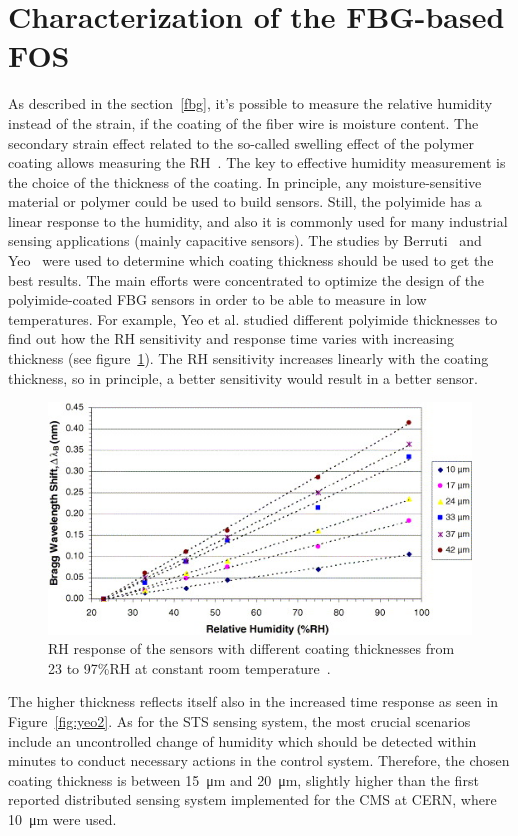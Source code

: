 \section{Characterization of the FBG-based FOS}
As described in the section~\ref{fbg}, it's possible to measure the relative humidity instead of the strain, if the coating of the fiber wire is moisture content. The secondary strain effect related to the so-called swelling effect of the polymer coating allows measuring the \gls{RH}~\cite{YEO_PI}. The key to effective humidity measurement is the choice of the thickness of the coating. In principle, any moisture-sensitive material or polymer could be used to build sensors. Still, the polyimide has a linear response to the humidity, and also it is commonly used for many industrial sensing applications (mainly capacitive sensors). The studies by Berruti~\cite{Berruti} and Yeo~\cite{YEO_PI} were used to determine which coating thickness should be used to get the best results. The main efforts were concentrated to optimize the design of the polyimide-coated FBG sensors in order to be able to measure in low temperatures. For example, Yeo et al. \cite{YEO_PI} studied different polyimide thicknesses to find out how the \gls{RH} sensitivity and response time varies with increasing thickness (see figure~\ref{fig:yeo}). The \gls{RH} sensitivity increases linearly with the coating thickness, so in principle, a better sensitivity would result in a better sensor.
\begin{figure}[!h]
\centering
\includegraphics[width=0.75\columnwidth]{Chapter5/images/yeo_coating.jpg}
\caption{RH response of the sensors with different coating thicknesses from 23 to 97\%RH at constant room temperature~\cite{YEO_PI}.}
\label{fig:yeo}
\end{figure}
The higher thickness reflects itself also in the increased time response as seen in Figure~\ref{fig:yeo2}. As for the \gls{STS} sensing system, the most crucial scenarios include an uncontrolled change of humidity which should be detected within minutes to conduct necessary actions in the control system. Therefore, the chosen coating thickness is between \SI{15}{\micro\metre} and \SI{20}{\micro\metre}, slightly higher than the first reported distributed sensing system implemented for the \gls{CMS} at \gls{CERN}, where \SI{10}{\micro\metre} were used. 
